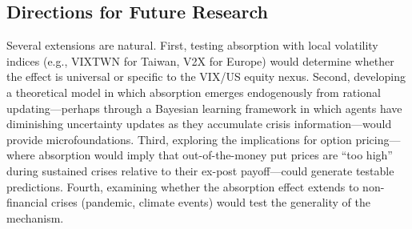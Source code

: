 \documentclass[12pt,a4paper]{article}
\begin{document}
\subsection{Directions for Future Research}

Several extensions are natural. First, testing absorption with local volatility indices (e.g., VIXTWN for Taiwan, V2X for Europe) would determine whether the effect is universal or specific to the VIX/US equity nexus. Second, developing a theoretical model in which absorption emerges endogenously from rational updating---perhaps through a Bayesian learning framework in which agents have diminishing uncertainty updates as they accumulate crisis information---would provide microfoundations. Third, exploring the implications for option pricing---where absorption would imply that out-of-the-money put prices are ``too high'' during sustained crises relative to their ex-post payoff---could generate testable predictions. Fourth, examining whether the absorption effect extends to non-financial crises (pandemic, climate events) would test the generality of the mechanism.

\newpage
\end{document}
